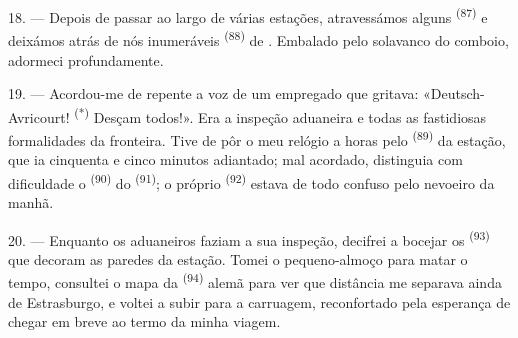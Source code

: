 18. --- Depois de passar ao largo de várias estações, atravessámos alguns
 \textsuperscript{(87)} e deixámos atrás de nós inumeráveis
 \textsuperscript{(88)} de . Embalado pelo
solavanco do comboio, adormeci profundamente.

\VUsaut{3.0mm}
\VUsaut{3.0mm}

19. --- Acordou-me de repente a voz de um empregado que gritava:
«Deutsch-Avricourt! \textsuperscript{(*)} Desçam todos!». Era a inspeção
aduaneira e todas as fastidiosas formalidades da fronteira. Tive de pôr o
meu relógio a horas pelo  \textsuperscript{(89)} da estação, que ia
cinquenta e cinco minutos adiantado; mal acordado, distinguia com
dificuldade o  \textsuperscript{(90)} do 
\textsuperscript{(91)}; o próprio  \textsuperscript{(92)} estava de todo
confuso pelo nevoeiro da manhã.

20. --- Enquanto os aduaneiros faziam a sua inspeção, decifrei a bocejar
os  \textsuperscript{(93)} que decoram as paredes da estação.
Tomei o pequeno-almoço para matar o tempo, consultei o mapa da
 \textsuperscript{(94)} alemã para ver que distância me separava ainda
de Estrasburgo, e voltei a subir para a carruagem, reconfortado pela
esperança de chegar em breve ao termo da minha viagem.
\VUsaut{6.0mm}
\VUfilet{22mm}
